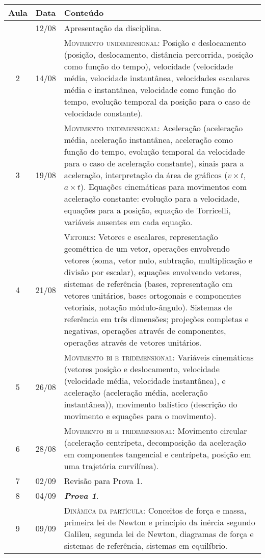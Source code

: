 \begin{center}
\begin{longtable}{ccp{70mm}}
\toprule
Aula & Data & Conteúdo \\
\midrule
\endhead
\bottomrule
\endfoot
1	 & 	12/08	 & 	Apresentação da disciplina. \\
2	 & 	14/08	 & 	\textsc{Movimento unidimensional:} Posição e deslocamento (posição, deslocamento, distância percorrida, posição como função do tempo), velocidade (velocidade média, velocidade instantânea, velocidades escalares média e instantânea, velocidade como função do tempo, evolução temporal da posição para o caso de velocidade constante). \\
3	 & 	19/08	 & 	\textsc{Movimento unidimensional:} Aceleração (aceleração média, aceleração instantânea, aceleração como função do tempo, evolução temporal da velocidade para o caso de aceleração constante), sinais para a aceleração, interpretação da área de gráficos ($v \times t$, $a \times  t$). Equações cinemáticas para movimentos com aceleração constante: evolução para a velocidade, equações para a posição, equação de Torricelli, variáveis ausentes em cada equação. \\
4	 & 	21/08	 & 	\textsc{Vetores:} Vetores e escalares, representação geométrica de um vetor, operações envolvendo vetores (soma, vetor nulo, subtração, multiplicação e divisão por escalar), equações envolvendo vetores, sistemas de referência (bases, representação em vetores unitários, bases ortogonais e componentes vetoriais, notação módulo-ângulo). Sistemas de referência em três dimensões; projeções completas e negativas, operações através de componentes, operações através de vetores unitários. \\
5	 & 	26/08	 &  	\textsc{Movimento bi e tridimensional:} Variáveis cinemáticas (vetores posição e deslocamento, velocidade (velocidade média, velocidade instantânea), e aceleração (aceleração média, aceleração instantânea)), movimento balístico (descrição do movimento e equações para o movimento). \\
6	 & 	28/08	 & 	\textsc{Movimento bi e tridimensional:} Movimento circular (aceleração centrípeta, decomposição da aceleração em componentes tangencial e centrípeta, posição em uma trajetória curvilínea). \\
7	 & 	02/09	 & 	Revisão para Prova 1. \\
8	 & 	04/09	 & 	\textbf{\textit{Prova 1}}. \\
9	 & 	09/09	 & 	\textsc{Dinâmica da partícula:} Conceitos de força e massa, primeira lei de Newton e princípio da inércia segundo Galileu, segunda lei de Newton, diagramas de força e sistemas de referência, sistemas em equilíbrio. \\

\end{longtable}
\end{center}
